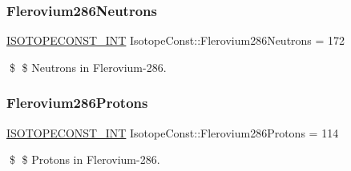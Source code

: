 \subsubsection{\texorpdfstring{Flerovium286\+Neutrons}{Flerovium286Neutrons}}
{\footnotesize\ttfamily \mbox{\hyperlink{group___isotope_const-_macros_ga5f18360b3e99483a35c32d789e62621c}{I\+S\+O\+T\+O\+P\+E\+C\+O\+N\+S\+T\+\_\+\+I\+NT}} Isotope\+Const\+::\+Flerovium286\+Neutrons = 172}

\$ \$ Neutrons in Flerovium-\/286. \mbox{\label{group___isotope_const-_flerovium-_fl286_gaef1dc42e211b6f41b28617025054c253}} 
\subsubsection{\texorpdfstring{Flerovium286\+Protons}{Flerovium286Protons}}
{\footnotesize\ttfamily \mbox{\hyperlink{group___isotope_const-_macros_ga5f18360b3e99483a35c32d789e62621c}{I\+S\+O\+T\+O\+P\+E\+C\+O\+N\+S\+T\+\_\+\+I\+NT}} Isotope\+Const\+::\+Flerovium286\+Protons = 114}

\$ \$ Protons in Flerovium-\/286. 
